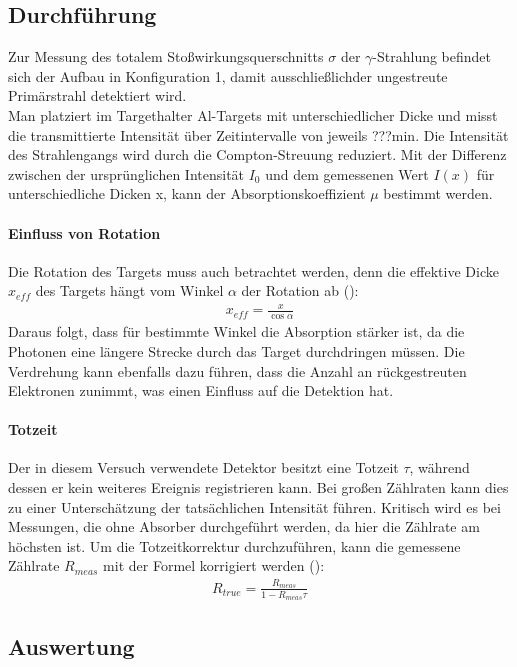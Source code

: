 \subsection{Durchführung}
Zur Messung des totalem Stoßwirkungsquerschnitts $\sigma$ der $\gamma$-Strahlung befindet sich der Aufbau in Konfiguration 1, damit ausschließlichder ungestreute Primärstrahl detektiert wird.\\
Man platziert im Targethalter Al-Targets mit unterschiedlicher Dicke und misst die transmittierte Intensität über Zeitintervalle von jeweils ???min. Die Intensität des Strahlengangs wird durch die Compton-Streuung reduziert. Mit der Differenz zwischen der ursprünglichen Intensität $I_0$ und dem gemessenen Wert $I(x)$ für unterschiedliche Dicken x, kann der Absorptionskoeffizient $\mu$ bestimmt werden.\\
\paragraph{Einfluss von Rotation}
Die Rotation des Targets muss auch betrachtet werden, denn die effektive Dicke $x_{eff}$ des Targets hängt vom Winkel $\alpha$ der Rotation ab (\cite{}):
\begin{align*}
    x_{eff} = \frac{x}{\cos \alpha}
\end{align*}
Daraus folgt, dass für bestimmte Winkel die Absorption stärker ist, da die Photonen eine längere Strecke durch das Target durchdringen müssen. Die Verdrehung kann ebenfalls dazu führen, dass die Anzahl an rückgestreuten Elektronen zunimmt, was einen Einfluss auf die Detektion hat. 
\paragraph{Totzeit}
Der in diesem Versuch verwendete Detektor besitzt eine Totzeit $\tau$, während dessen er kein weiteres Ereignis registrieren kann. Bei großen Zählraten kann dies zu einer Unterschätzung der tatsächlichen Intensität führen. Kritisch wird es bei Messungen, die ohne Absorber durchgeführt werden, da hier die Zählrate am höchsten ist. Um die Totzeitkorrektur durchzuführen, kann die gemessene Zählrate $R_{meas}$ mit der Formel korrigiert werden (\cite{}):
\begin{align*}    
    R_{true} = \frac{R_{meas}}{1 - R_{me as} \tau}
\end{align*}
\subsection{Auswertung}